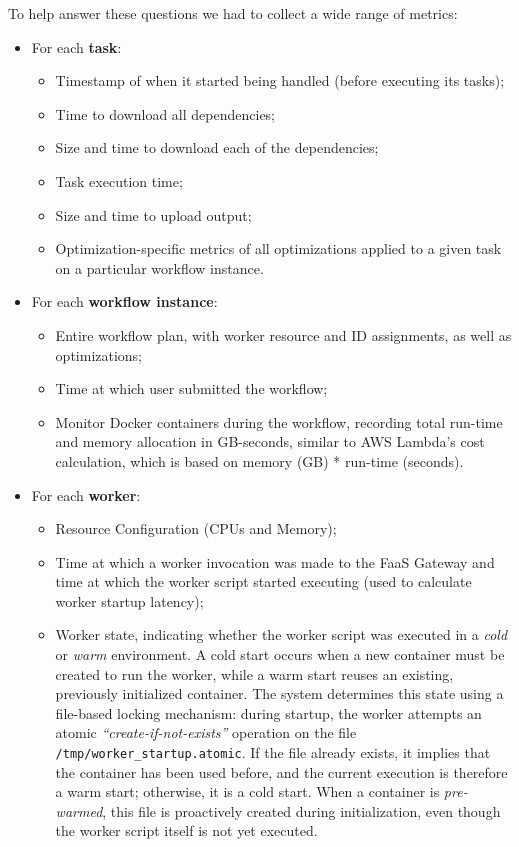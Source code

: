\documentclass[conference]{IEEEtran}
\begin{document}
To help answer these questions we had to collect a wide range of metrics:

\begin{itemize}
    \item For each \textbf{task}:
    \begin{itemize}
        \item Timestamp of when it started being handled (before executing its tasks);
        \item Time to download all dependencies;
        \item Size and time to download each of the dependencies;
        \item Task execution time;
        \item Size and time to upload output;
        \item Optimization-specific metrics of all optimizations applied to a given task on a particular workflow instance.
    \end{itemize}
    \item For each \textbf{workflow instance}:
    \begin{itemize}
        \item Entire workflow plan, with worker resource and ID assignments, as well as optimizations;
        \item Time at which user submitted the workflow;
        \item Monitor Docker containers during the workflow, recording total run-time and memory allocation in GB-seconds, similar to AWS Lambda's cost calculation, which is based on memory (GB) * run-time (seconds).
    \end{itemize}
    \item For each \textbf{worker}:
    \begin{itemize}
        \item Resource Configuration (CPUs and Memory);
        \item Time at which a worker invocation was made to the FaaS Gateway and time at which the worker script started executing (used to calculate worker startup latency);
        \item Worker state, indicating whether the worker script was executed in a \textit{cold} or \textit{warm} environment. A cold start occurs when a new container must be created to run the worker, while a warm start reuses an existing, previously initialized container. The system determines this state using a file-based locking mechanism: during startup, the worker attempts an atomic \textit{“create-if-not-exists”} operation on the file \texttt{/tmp/worker\_startup.atomic}. If the file already exists, it implies that the container has been used before, and the current execution is therefore a warm start; otherwise, it is a cold start. When a container is \textit{pre-warmed}, this file is proactively created during initialization, even though the worker script itself is not yet executed.
    \end{itemize}
\end{itemize}
\end{document}
